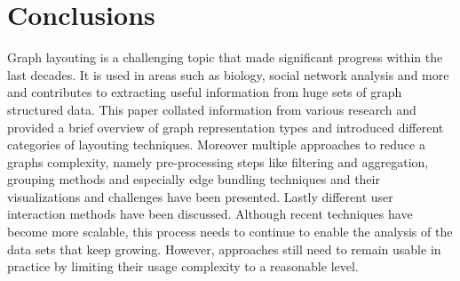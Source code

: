 \section{Conclusions}
Graph layouting is a challenging topic that made significant progress within the last decades. It is used in areas such as biology, social network analysis and more and contributes to extracting useful information from huge sets of graph structured data. This paper collated information from various research and provided a brief overview of graph representation types and introduced different categories of layouting techniques. Moreover multiple approaches to reduce a graphs complexity, namely pre-processing steps like filtering and aggregation, grouping methods and especially edge bundling techniques and their visualizations and challenges have been presented. Lastly different user interaction methods have been discussed. Although recent techniques have become more scalable, this process needs to continue to enable the analysis of the data sets that keep growing. However, approaches still need to remain usable in practice by limiting their usage complexity to a reasonable level.



%








